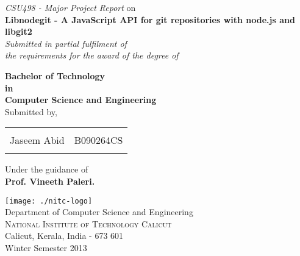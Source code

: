 \begin{titlepage}

\begin{center}

\textup{\textit{CSU498 - Major Project Report} on }\\[0.2in]

\Large \textbf {Libnodegit - A JavaScript API for git repositories with
node.js and libgit2}\\[0.5in]

       \small \emph{Submitted in partial fulfilment of\\
        the requirements for the award of the degree of}
        \vspace{.2in}

       {\bf Bachelor of Technology \\in\\ Computer Science and Engineering}\\[0.5in]

\normalsize Submitted by, \\
\begin{table}[h]
  \centering
  \begin{tabular}{lr}\hline \\
    Jaseem Abid & B090264CS \\ \\ \hline
  \end{tabular}
\end{table}

\vspace{.1in}
Under the guidance of \\
{\textbf{Prof. Vineeth Paleri.}}\\[0.2in]

\vfill

\texttt{[image: ./nitc-logo]}\\[0.1in]
\Large{Department of Computer Science and Engineering}\\
\normalsize
\textsc{National Institute of Technology Calicut}\\
Calicut, Kerala, India - 673 601 \\
\vspace{0.2cm}
Winter Semester 2013

\end{center}

\end{titlepage}
